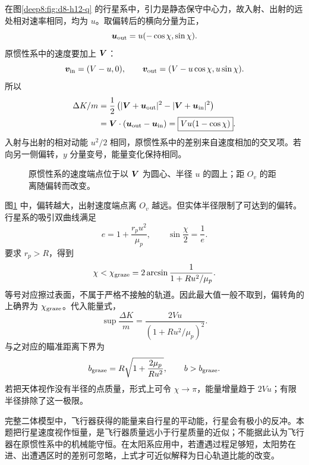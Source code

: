 \begin{solution}
\begingroup
\setlength{\parskip}{2pt}
\setlength{\abovedisplayskip}{2pt}\setlength{\belowdisplayskip}{2pt}
\setlength{\belowdisplayshortskip}{2pt}
在图\ref{deep8:fig:d8-h12-q} 的行星系中，引力是静态保守中心力，故入射、出射的远处相对速率相同，均为 $u$。取偏转后的横向分量为正，
\[
 \bm{u}_{\rm out}=u(-\cos\chi,\sin\chi).
\]
原惯性系中的速度要加上 $\bm{V}$：
\[
 \bm{v}_{\rm in}=(V-u,0),\qquad
 \bm{v}_{\rm out}=(V-u\cos\chi,u\sin\chi).
\]
所以
\begin{align*}
 \Delta K/m
 &=\frac12\left(|\bm{V}+\bm{u}_{\rm out}|^2
                  -|\bm{V}+\bm{u}_{\rm in}|^2\right)\\
 &=\bm{V}\cdot(\bm{u}_{\rm out}-\bm{u}_{\rm in})
 =\boxed{Vu(1-\cos\chi)}.
\end{align*}
入射与出射的相对动能 $u^2/2$ 相同，原惯性系中的差别来自速度相加的交叉项。若向另一侧偏转，$y$ 分量变号，能量变化保持相同。
\begin{figure}[H]\centering
{}
\caption{原惯性系的速度端点位于以 $\bm{V}$ 为圆心、半径 $u$ 的圆上；距 $O_v$ 的距离随偏转而改变。}\label{deep8:fig:d8-h12-s}
\end{figure}
图\ref{deep8:fig:d8-h12-s} 中，偏转越大，出射速度端点离 $O_v$ 越远。但实体半径限制了可达到的偏转。行星系的吸引双曲线满足
\[
 e=1+\frac{r_pu^2}{\mu_p},\qquad
 \sin\frac\chi2=\frac1e.
\]
要求 $r_p>R$，得到
\[
 \chi<\chi_{\rm graze}=2\arcsin\frac1{1+Ru^2/\mu_p}.
\]
等号对应擦过表面，不属于严格不接触的轨道。因此最大值一般不取到，偏转角的上确界为 $\chi_{\rm graze}$。代入能量式，
\[
 \boxed{\sup\frac{\Delta K}m
 =\frac{2Vu}{(1+Ru^2/\mu_p)^2}}.
\]
与之对应的瞄准距离下界为
\[
 b_{\rm graze}=R\sqrt{1+\frac{2\mu_p}{Ru^2}},\qquad b>b_{\rm graze}.
\]
若把天体视作没有半径的点质量，形式上可令 $\chi\to\pi$，能量增量趋于 $2Vu$；有限半径排除了这一极限。

完整二体模型中，飞行器获得的能量来自行星的平动能，行星会有极小的反冲。本题把行星速度视作恒量，是飞行器质量远小于行星质量的近似；不能据此认为飞行器在原惯性系中的机械能守恒。在太阳系应用中，若遭遇过程足够短，太阳势在进、出遭遇区时的差别可忽略，上式才可近似解释为日心轨道比能的改变。
\par\endgroup
\end{solution}

